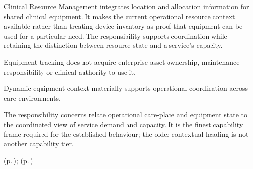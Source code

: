 Clinical Resource Management integrates location and allocation information for shared clinical equipment. It makes the current operational resource context available rather than treating device inventory as proof that equipment can be used for a particular need. The responsibility supports coordination while retaining the distinction between resource state and a service's capacity.



Equipment tracking does not acquire enterprise asset ownership, maintenance responsibility or clinical authority to use it.



Dynamic equipment context materially supports operational coordination across care environments.



The responsibility concerns relate operational care-place and equipment state to the coordinated view of service demand and capacity. It is the finest capability frame required for the established behaviour; the older contextual heading is not another capability tier.


 (p.\,\pageref{cap:bec-reviewed-device-utilisation-administration});  (p.\,\pageref{cap:bec-reviewed-clinical-service-dependency-management})
